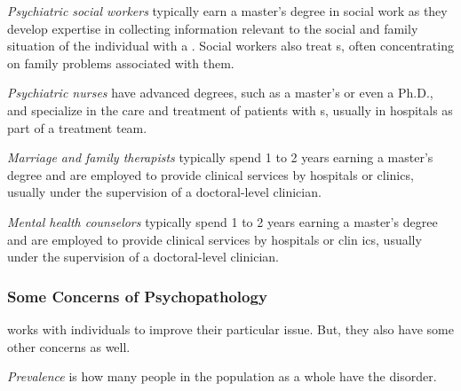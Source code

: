\begin{definition}\label{def:Psychiatric_Social_Worker}
  \emph{Psychiatric social workers} typically earn a master's degree in social work as they develop expertise in collecting information relevant to the social and family situation of the individual with a .
  Social workers also treat s, often concentrating on family problems associated with them.
\end{definition}

\begin{definition}\label{def:Psychiatric_Nurse}
  \emph{Psychiatric nurses} have advanced degrees, such as a master's or even a Ph.D., and specialize in the care and treatment of patients with s, usually in hospitals as part of a treatment team.
\end{definition}

\begin{definition}\label{def:Marriage_Family_Therapist}
  \emph{Marriage and family therapists} typically spend 1 to 2 years earning a master’s degree and are employed to provide clinical services by hospitals or clinics, usually under the supervision of a doctoral-level clinician.
\end{definition}

\begin{definition}\label{def:Mental_Health_Counselor}
  \emph{Mental health counselors} typically spend 1 to 2 years earning a master’s degree and are employed to provide clinical services by hospitals or clin ics, usually under the supervision of a doctoral-level clinician.
\end{definition}

\subsubsection{Some Concerns of Psychopathology}\label{subsubsec:Psychopathology_Concerns}
 works with individuals to improve their particular issue.
But, they also have some other concerns as well.

\begin{definition}[Prevalence]\label{def:Prevalence}
  \emph{Prevalence} is how many people in the population as a whole have the disorder.
\end{definition}

